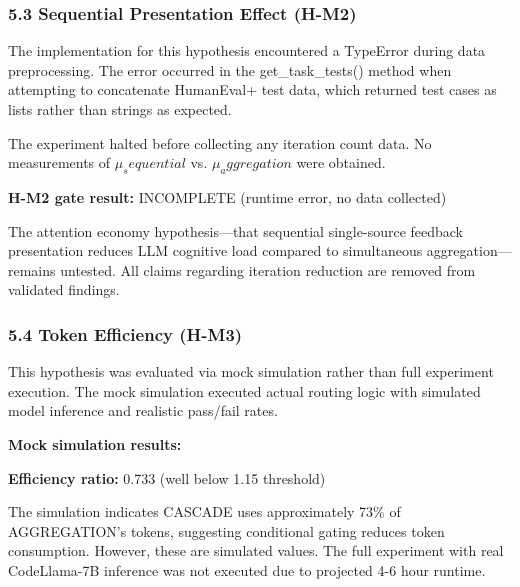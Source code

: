 \subsubsection{5.3 Sequential Presentation Effect (H-M2)}

The implementation for this hypothesis encountered a TypeError during data preprocessing. The error occurred in the get\_task\_tests() method when attempting to concatenate HumanEval+ test data, which returned test cases as lists rather than strings as expected.

The experiment halted before collecting any iteration count data. No measurements of $\mu _sequential$ vs. $\mu _aggregation$ were obtained.

\textbf{H-M2 gate result:} INCOMPLETE (runtime error, no data collected)

The attention economy hypothesis---that sequential single-source feedback presentation reduces LLM cognitive load compared to simultaneous aggregation---remains untested. All claims regarding iteration reduction are removed from validated findings.

\subsubsection{5.4 Token Efficiency (H-M3)}

This hypothesis was evaluated via mock simulation rather than full experiment execution. The mock simulation executed actual routing logic with simulated model inference and realistic pass/fail rates.

\textbf{Mock simulation results:}

\begin{table}[htbp]
\centering
{}
\end{table}

\textbf{Efficiency ratio:} 0.733 (well below 1.15 threshold)

The simulation indicates CASCADE uses approximately 73\% of AGGREGATION's tokens, suggesting conditional gating reduces token consumption. However, these are simulated values. The full experiment with real CodeLlama-7B inference was not executed due to projected 4-6 hour runtime.

